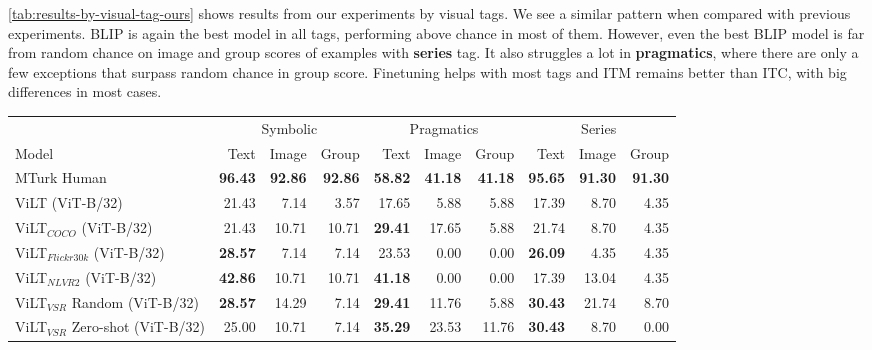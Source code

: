 \cref{tab:results-by-visual-tag-ours} shows results from our experiments by visual tags. We see a similar pattern when compared with previous experiments. BLIP is again the best model in all tags, performing above chance in most of them. However, even the best BLIP model is far from random chance on image and group scores of examples with \textbf{series} tag. It also struggles a lot in \textbf{pragmatics}, where there are only a few exceptions that surpass random chance in group score. Finetuning helps with most tags and ITM remains better than ITC, with big differences in most cases.

\begin{table}[ht]
    \centering
   \begin{adjustbox}{max width=0.8\textwidth}
  \begin{tabular}{l|rrr|rrr|rrr}
    \toprule
     &
      \multicolumn{3}{c|}{Symbolic} &
      \multicolumn{3}{c|}{Pragmatics} &
      \multicolumn{3}{c}{Series} \\
    Model & Text & Image & Group & Text & Image & Group & Text & Image & Group \\\midrule
 MTurk Human                  & \textbf{96.43} & \textbf{92.86} & \textbf{92.86} & \textbf{58.82} & \textbf{41.18} & \textbf{41.18} & \textbf{95.65} & \textbf{91.30} & \textbf{91.30} \\
 ViLT (ViT-B/32)                     & 21.43          & 7.14           & 3.57           & 17.65          & 5.88           & 5.88           & 17.39          & 8.70           & 4.35           \\
 ViLT$_{COCO}$ (ViT-B/32)            & 21.43          & 10.71          & 10.71          & \textbf{29.41} & 17.65          & 5.88           & 21.74          & 8.70           & 4.35           \\
 ViLT$_{Flickr30k}$ (ViT-B/32)       & \textbf{28.57} & 7.14           & 7.14           & 23.53          & 0.00           & 0.00           & \textbf{26.09} & 4.35           & 4.35           \\
 ViLT$_{NLVR2}$ (ViT-B/32)           & \textbf{42.86} & 10.71          & 10.71          & \textbf{41.18} & 0.00           & 0.00           & 17.39          & 13.04          & 4.35           \\
 ViLT$_{VSR}$ Random (ViT-B/32)      & \textbf{28.57} & 14.29          & 7.14           & \textbf{29.41} & 11.76          & 5.88           & \textbf{30.43} & 21.74          & 8.70           \\
 ViLT$_{VSR}$ Zero-shot (ViT-B/32)   & 25.00          & 10.71          & 7.14           & \textbf{35.29} & 23.53          & 11.76          & \textbf{30.43} & 8.70           & 0.00           \\

\end{tabular}
\end{adjustbox}
\end{table}
